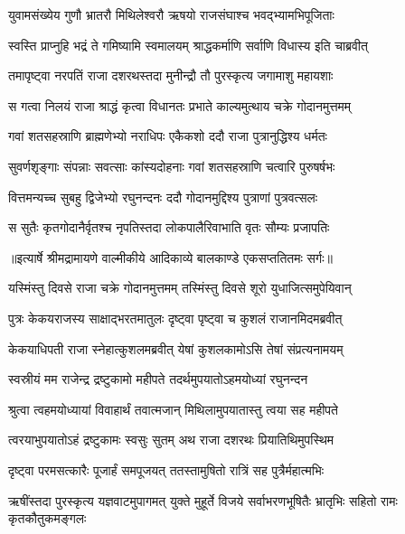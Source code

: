 \twolineshloka
{युवामसंख्येय गुणौ भ्रातरौ मिथिलेश्वरौ}
{ऋषयो राजसंघाश्च भवद्भ्यामभिपूजिताः} %

\twolineshloka
{स्वस्ति प्राप्नुहि भद्रं ते गमिष्यामि स्वमालयम्}
{श्राद्धकर्माणि सर्वाणि विधास्य इति चाब्रवीत्} %

\twolineshloka
{तमापृष्ट्वा नरपतिं राजा दशरथस्तदा}
{मुनीन्द्रौ तौ पुरस्कृत्य जगामाशु महायशाः} %

\twolineshloka
{स गत्वा निलयं राजा श्राद्धं कृत्वा विधानतः}
{प्रभाते काल्यमुत्थाय चक्रे गोदानमुत्तमम्} %

\twolineshloka
{गवां शतसहस्राणि ब्राह्मणेभ्यो नराधिपः}
{एकैकशो ददौ राजा पुत्रानुद्धिश्य धर्मतः} %

\twolineshloka
{सुवर्णशृङ्गाः संपन्नाः सवत्साः कांस्यदोहनाः}
{गवां शतसहस्राणि चत्वारि पुरुषर्षभः} %

\twolineshloka
{वित्तमन्यच्च सुबहु द्विजेभ्यो रघुनन्दनः}
{ददौ गोदानमुद्दिश्य पुत्राणां पुत्रवत्सलः} %

\twolineshloka
{स सुतैः कृतगोदानैर्वृतश्च नृपतिस्तदा}
{लोकपालैरिवाभाति वृतः सौम्यः प्रजापतिः} %


{॥इत्यार्षे श्रीमद्रामायणे वाल्मीकीये आदिकाव्ये बालकाण्डे एकसप्ततितमः सर्गः॥}


\twolineshloka
{यस्मिंस्तु दिवसे राजा चक्रे गोदानमुत्तमम्}
{तस्मिंस्तु दिवसे शूरो युधाजित्समुपेयिवान्} %

\twolineshloka
{पुत्रः केकयराजस्य साक्षाद्भरतमातुलः}
{दृष्ट्वा पृष्ट्वा च कुशलं राजानमिदमब्रवीत्} %

\twolineshloka
{केकयाधिपती राजा स्नेहात्कुशलमब्रवीत्}
{येषां कुशलकामोऽसि तेषां संप्रत्यनामयम्} %

\twolineshloka
{स्वस्रीयं मम राजेन्द्र द्रष्टुकामो महीपते}
{तदर्थमुपयातोऽहमयोध्यां रघुनन्दन} %

\twolineshloka
{श्रुत्वा त्वहमयोध्यायां विवाहार्थं तवात्मजान्}
{मिथिलामुपयातास्तु त्वया सह महीपते} %

\twolineshloka
{त्वरयाभुपयातोऽहं द्रष्टुकामः स्वसुः सुतम्}
{अथ राजा दशरथः प्रियातिथिमुपस्थिम} %

\twolineshloka
{दृष्ट्वा परमसत्कारैः पूजार्हं समपूजयत्}
{ततस्तामुषितो रात्रिं सह पुत्रैर्महात्मभिः} %

\threelineshloka
{ऋषींस्तदा पुरस्कृत्य यज्ञवाटमुपागमत्}
{युक्ते मुहूर्ते विजये सर्वाभरणभूषितैः}
{भ्रातृभिः सहितो रामः कृतकौतुकमङ्गलः} %

